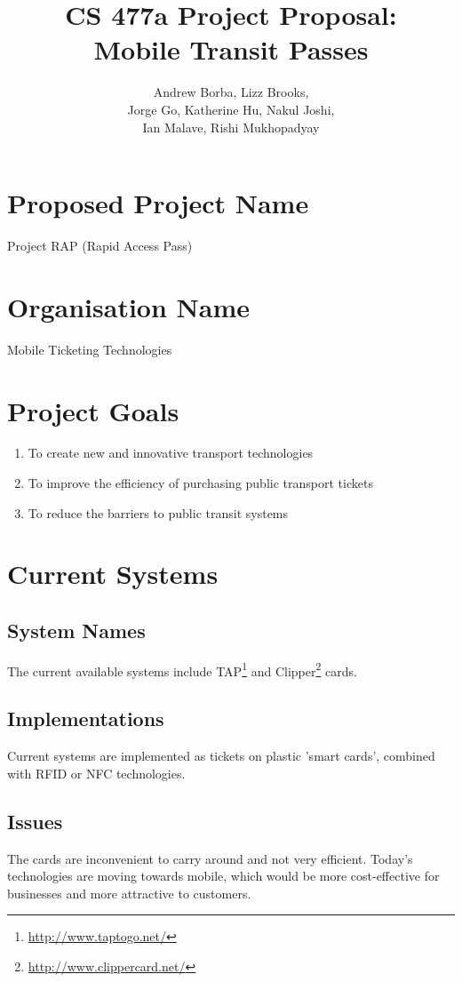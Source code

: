 \documentclass{article}
\title{CS 477a Project Proposal: \\Mobile Transit Passes}
\date{}
\author{
	Andrew Borba,
	Lizz Brooks,\\
	Jorge Go,
	Katherine Hu,
	Nakul Joshi,\\
	Ian Malave,
	Rishi Mukhopadyay
}
\begin{document}
\maketitle

\section{Proposed Project Name}
Project RAP (Rapid Access Pass)

\section{Organisation Name}
Mobile Ticketing Technologies

\section{Project Goals}
\begin{enumerate}
	\item To create new and innovative transport technologies
	\item To improve the efficiency of purchasing public transport tickets
	\item To reduce the barriers to public transit systems
\end{enumerate}

\section{Current Systems}
	\subsection{System Names}
		The current available systems include TAP\footnote{\url{http://www.taptogo.net/}} and Clipper\footnote{\url{http://www.clippercard.net/}} cards.
	\subsection{Implementations}
		Current systems are implemented as tickets on plastic 'smart cards', combined with RFID or NFC technologies.
	\subsection{Issues}
		The cards are inconvenient to carry around and not very efficient. Today's technologies are moving towards mobile, which would be more cost-effective for businesses and more attractive to customers.
\end{document}
